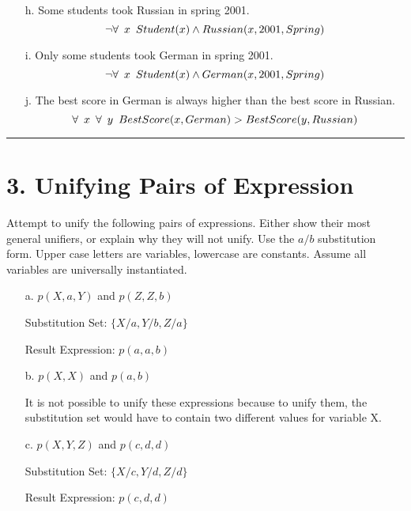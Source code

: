 \documentclass[11pt]{article}
\begin{document}
\begin{flushleft}
\begin{enumerate}
    \item[h.] Some students took Russian in spring 2001.
        $$ \neg \forall \hspace{0.5em} x \hspace{0.5em} Student(x) \wedge
        Russian(x, 2001, Spring) $$

    \item[i.] Only some students took German in spring 2001.
        $$ \neg \forall \hspace{0.5em} x \hspace{0.5em} Student(x) \wedge
        German(x, 2001, Spring) $$

    \item[j.] The best score in German is always higher than the best score
        in Russian.
        $$ \forall \hspace{0.5em} x \hspace{0.5em} \forall \hspace{0.5em} y
        \hspace{0.5em} BestScore(x, German) > BestScore(y, Russian) $$

\end{enumerate}

\rule[0.1pt]{40em}{1.0pt}

\section*{3. Unifying Pairs of Expression}  Attempt to unify the following pairs
of expressions.  Either show their most general unifiers, or explain why they
will not unify. Use the ${a/b}$ substitution form. Upper case letters are
variables, lowercase are constants. Assume all variables are universally
instantiated. 

\begin{enumerate}

    \item[a.] $p(X, a, Y)$ and $p(Z, Z, b)$ \par
        Substitution Set: $\{X/a, Y/b, Z/a\}$\par
        Result Expression: $p(a, a, b)$
               
    \item[b.] $p(X, X)$ and $p(a, b)$ \par
        It is not possible to unify these expressions because to unify them,
        the substitution set would have to contain two different values for
        variable X.

    \item[c.] $p(X, Y, Z)$ and $p(c, d, d)$\par
        Substitution Set: $\{X/c, Y/d, Z/d\}$\par
        Result Expression: $p(c, d, d)$


\end{enumerate}
\end{flushleft}
\end{document}
